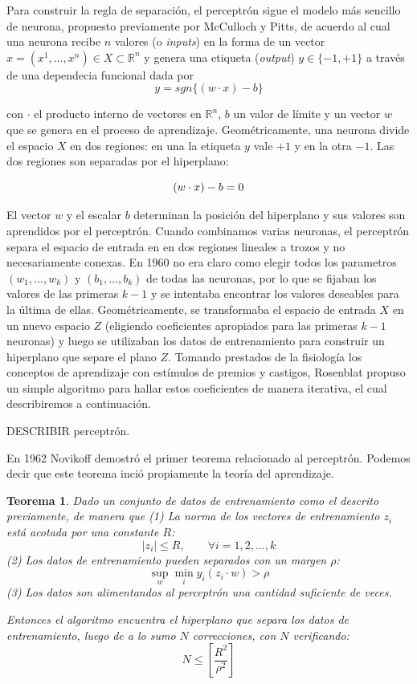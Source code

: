 \documentclass{report}
\newtheorem{thm}{Teorema}[subsection]
\begin{document}
Para construir la regla de separación, el perceptrón sigue el modelo más sencillo de neurona, propuesto previamente por McCulloch y Pitts, de acuerdo al cual una neurona recibe
\(n\) valores (o \textit{inputs}) en la forma de un vector \(x = (x^1,\dots, x^n) \in X \subset \mathbb{R}^n \) y genera una etiqueta (\textit{output}) 
\(y\in\{-1,+1\}\) a través de una dependecia funcional dada por
\[
y = sgn\{(w\cdot x)-b\}
\]

con \(\cdot\) el producto interno de vectores en \(\mathbb{R}^n\), \(b\) un valor de límite y un vector \(w\) que se genera en el proceso de aprendizaje. Geométricamente, una 
neurona divide el espacio \(X\) en dos regiones: en una la etiqueta \(y\) vale \(+1\) y en la otra \(-1\). Las dos regiones son separadas por el hiperplano:\newline

\[
(w\cdot x) - b = 0 \newline
\]

El vector \(w\) y el escalar \(b\) determinan la posición del hiperplano y sus valores son aprendidos por el perceptrón. Cuando combinamos varias neuronas, el perceptrón
separa el espacio de entrada en en dos regiones lineales a trozos y no necesariamente conexas. En 1960 no era claro como elegir todos los parametros \((w_1,\dots,w_k)\) y
\((b_1,\dots, b_k)\) de todas las neuronas, por lo que se fijaban los valores de las primeras \(k-1\) y se intentaba encontrar los valores deseables para la última
de ellas. Geométricamente, se transformaba el espacio de entrada $X$ en un nuevo espacio $Z$ (eligiendo coeficientes apropiados para las primeras $k-1$ neuronas) y luego
se utilizaban los datos de entrenamiento para construir un hiperplano que separe el plano $Z$.
Tomando prestados de la fisiología los conceptos de aprendizaje con estímulos de premios y castigos, Rosenblat propuso un simple algoritmo para hallar estos 
coeficientes de manera iterativa, el cual describiremos a continuación.\newline

DESCRIBIR perceptrón.\newline

En 1962 Novikoff demostró el primer teorema relacionado al perceptrón. Podemos decir que este teorema inció propiamente la teoría del aprendizaje.

\begin{thm}
Dado un conjunto de datos de entrenamiento como el descrito previamente, de manera que\newline
(1) La norma de los vectores de entrenamiento $z_i$ está acotada por una constante $R$:
\[
|z_i| \leq R, \qquad \forall i=1,2,\dots,k
\]
(2) Los datos de entrenamiento pueden separados con un margen $\rho$:
\[
\sup_{w} \min_{i} y_i(z_i\cdot w) > \rho
\]
(3) Los datos son alimentandos al perceptrón una cantidad \textit{suficiente} de veces.

Entonces el algoritmo encuentra el hiperplano que separa los datos de entrenamiento, luego de a lo
sumo $N$ correcciones, con $N$ verificando:
\[
N \leq \left [ \frac{R^2}{\rho^2}\right ]
\]

\end{thm}
\end{document}
